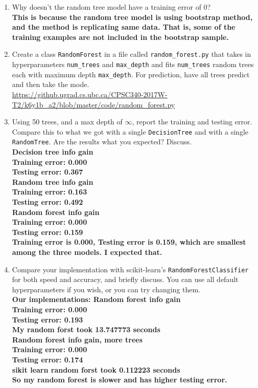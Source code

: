 \documentclass{article}
\def\blu#1{{\color{blu}#1}}
\def\enum#1{\begin{enumerate}#1\end{enumerate}}
\begin{document}
\blu{
\enum{
\item Why doesn't the random tree model have a training error of 0?\\
\textbf{This is because the random tree model is using bootstrap method, and the method is replicating same data. That is, some of the training examples are not included in the bootstrap sample. }
\item Create a class \texttt{RandomForest} in a file called \texttt{random\string_forest.py} that takes in hyperparameters \texttt{num\string_trees} and \texttt{max\string_depth} and
fits \texttt{num\string_trees} random trees each with maximum depth \texttt{max\string_depth}. For prediction, have all trees predict and then take the mode.\\
\url{https://github.ugrad.cs.ubc.ca/CPSC340-2017W-T2/k6y1b_a2/blob/master/code/random_forest.py}
\item Using 50 trees, and a max depth of $\infty$, report the training and testing error. Compare this to what we got with a single \texttt{DecisionTree} and with a single \texttt{RandomTree}. Are the results what you expected? Discuss.\\
\textbf{Decision tree info gain\\
	Training error: 0.000\\
	Testing error: 0.367\\
	Random tree info gain\\
	Training error: 0.163\\
	Testing error: 0.492\\
	Random forest info gain\\
	Training error: 0.000\\
	Testing error: 0.159\\
	Training error is 0.000, Testing error is 0.159, which are smallest among the three models. I expected that.
}
\item Compare your implementation with scikit-learn's \texttt{RandomForestClassifier} for both speed and accuracy, and briefly discuss. You can use all default hyperparameters if you wish, or you can try changing them.\\
\textbf{Our implementations:
  Random forest info gain\\
Training error: 0.000\\
Testing error: 0.193\\
My random forst took 13.747773 seconds\\
Random forest info gain, more trees\\
Training error: 0.000\\
Testing error: 0.174\\
sikit learn random forst took 0.112223 seconds\\
So my random forest is slower and has higher testing error.	
}
}
}
\end{document}
